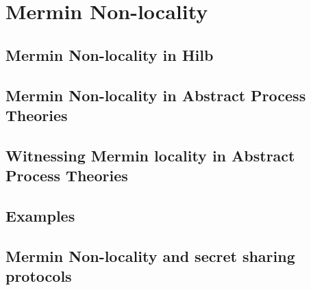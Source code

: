 \chapter{\color{blue} Mermin Non-locality}
\label{chap:mermin}

\section{Mermin Non-locality in Hilb}

\section{Mermin Non-locality in Abstract Process Theories}

\section{Witnessing Mermin locality in Abstract Process Theories}

\section{Examples}

\section{Mermin Non-locality and secret sharing protocols}
